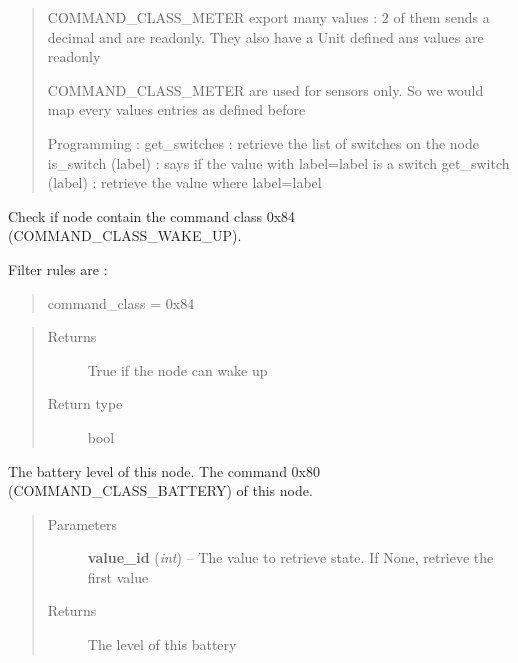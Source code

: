 \documentclass[letterpaper,10pt,english]{sphinxmanual}
\begin{document}
\begin{fulllineitems}
\begin{quote}
COMMAND\_CLASS\_METER export many values : 2 of them sends a decimal
and are readonly. They also have a Unit defined ans values are readonly

COMMAND\_CLASS\_METER are used for sensors only. So we would map
every values entries as defined before

Programming :
get\_switches : retrieve the list of switches on the node
is\_switch (label) : says if the value with label=label is a switch
get\_switch (label) : retrieve the value where label=label
\end{quote}

\begin{fulllineitems}
\label{command:openzwave.command.ZWaveNodeBasic.can_wake_up}
Check if node contain the command class 0x84 (COMMAND\_CLASS\_WAKE\_UP).

Filter rules are :
\begin{quote}

command\_class = 0x84
\end{quote}
\begin{quote}\begin{description}
\item[{Returns}] \leavevmode
True if the node can wake up

\item[{Return type}] \leavevmode
bool

\end{description}\end{quote}

\end{fulllineitems}


\begin{fulllineitems}
\label{command:openzwave.command.ZWaveNodeBasic.get_battery_level}
The battery level of this node.
The command 0x80 (COMMAND\_CLASS\_BATTERY) of this node.
\begin{quote}\begin{description}
\item[{Parameters}] \leavevmode
\textbf{value\_id} (\emph{int}) -- The value to retrieve state. If None, retrieve the first value

\item[{Returns}] \leavevmode
The level of this battery


\end{description}
\end{quote}
\end{fulllineitems}
\end{fulllineitems}
\end{document}
